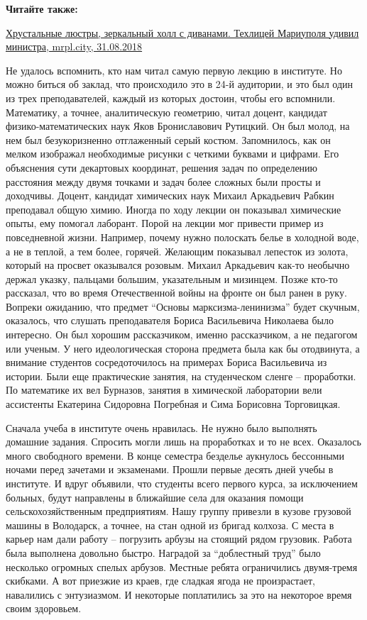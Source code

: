 \textbf{Читайте также:} 

\href{https://mrpl.city/news/view/hrustalnye-lyustry-zerkalnyj-holl-s-divanami-tehlitsej-mariupolya-udivil-ministra-fotofakt}{%
Хрустальные люстры, зеркальный холл с диванами. Техлицей Мариуполя удивил министра, mrpl.city, 31.08.2018}

Не удалось вспомнить, кто нам читал самую первую лекцию в институте. Но можно
биться об заклад, что происходило это в 24-й аудитории, и это был один из трех
преподавателей, каждый из которых достоин, чтобы его вспомнили. Математику, а
точнее, аналитическую геометрию, читал доцент, кандидат физико-математических
наук Яков Брониславович Рутицкий. Он был молод, на нем был безукоризненно
отглаженный серый костюм. Запомнилось, как он мелком изображал необходимые
рисунки с четкими буквами и цифрами. Его объяснения сути декартовых координат,
решения задач по определению расстояния между двумя точками и задач более
сложных были просты и доходчивы. Доцент, кандидат химических наук Михаил
Аркадьевич Рабкин преподавал общую химию. Иногда по ходу лекции он показывал
химические опыты, ему помогал лаборант. Порой на лекции мог привести пример из
повседневной жизни. Например, почему нужно полоскать белье в холодной воде, а
не в теплой, а тем более, горячей. Желающим показывал лепесток из золота,
который на просвет оказывался розовым. Михаил Аркадьевич как-то необычно держал
указку, пальцами большим, указательным и мизинцем. Позже кто-то рассказал, что
во время Отечественной войны на фронте он был ранен в руку. Вопреки ожиданию,
что предмет \enquote{Основы марксизма-ленинизма} будет скучным, оказалось, что слушать
преподавателя Бориса Васильевича Николаева было интересно. Он был хорошим
рассказчиком, именно рассказчиком, а не педагогом или ученым. У него
идеологическая сторона предмета была как бы отодвинута, а внимание студентов
сосредоточилось на примерах Бориса Васильевича из истории. Были еще
практические занятия, на студенческом сленге – проработки. По математике их вел
Бурназов, занятия в химической лаборатории вели ассистенты Екатерина Сидоровна
Погребная и Сима Борисовна Торговицкая.


Сначала учеба в институте очень нравилась. Не нужно было выполнять домашние
задания. Спросить могли лишь на проработках и то не всех. Оказалось много
свободного времени. В конце семестра безделье аукнулось бессонными ночами перед
зачетами и экзаменами. Прошли первые десять дней учебы в институте. И вдруг
объявили, что студенты всего первого курса, за исключением больных, будут
направлены в ближайшие села для оказания помощи сельскохозяйственным
предприятиям. Нашу группу привезли в кузове грузовой машины в Володарск, а
точнее, на стан одной из бригад колхоза. С места в карьер нам дали работу –
погрузить арбузы на стоящий рядом грузовик. Работа была выполнена довольно
быстро. Наградой за \enquote{доблестный труд} было несколько огромных спелых арбузов.
Местные ребята ограничились двумя-тремя скибками. А вот приезжие из краев, где
сладкая ягода не произрастает, навалились с энтузиазмом. И некоторые
поплатились за это на некоторое время своим здоровьем.

